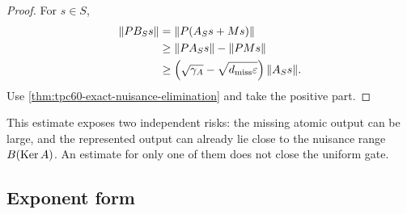 \begin{proof}
For \(s\in S\),
\begin{align*}
 \|PB_Ss\|
 &=\|P(A_Ss+Ms)\|\\
 &\ge\|PA_Ss\|-\|PMs\|\\
 &\ge
 \left(\sqrt{\gamma_A}-\sqrt{d_{\rm miss}\varepsilon}\right)
 \|A_Ss\|.
\end{align*}
Use \cref{thm:tpc60-exact-nuisance-elimination} and take the positive part.
\end{proof}

This estimate exposes two independent risks: the missing atomic output can
be large, and the represented output can already lie close to the nuisance
range \(B(\operatorname{Ker} A)\).  An estimate for only one of them does not close the
uniform gate.

\subsection{Exponent form}

